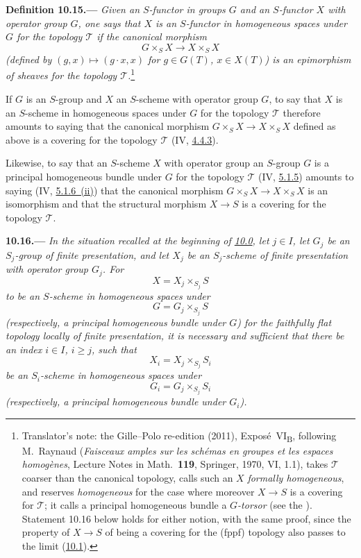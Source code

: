 \medskip
{}\label{def:sga3-VIB-10.15}%
\noindent\textbf{Definition 10.15.---}%
\emph{Given an \(S\)-functor in groups \(G\) and an \(S\)-functor \(X\)
with operator group \(G\), one says that \(X\) is an \(S\)-functor in
homogeneous spaces under \(G\) for the topology \(\mathcal T\) if the
canonical morphism}
\label{form:sga3-VIB-10.15-Phi}%
\[
  G\times_S X\longrightarrow X\times_S X
\]
\emph{\textup{(}defined by \((g,x)\mapsto(g\cdot x,x)\) for \(g\in G(T)\),
\(x\in X(T)\)\textup{)} is an epimorphism of sheaves for the topology
\(\mathcal T\).}\footnote{Translator's note: the Gille--Polo re-edition (2011),
Expos\'e~VI\textsubscript{B}, following M.~Raynaud (\emph{Faisceaux amples sur les sch\'emas en groupes et les
espaces homog\`enes}, Lecture Notes in Math.\ \textbf{119}, Springer, 1970, VI, 1.1), takes \(\mathcal T\)
coarser than the canonical topology, calls such an \(X\) \emph{formally homogeneous}, and reserves
\emph{homogeneous} for the case where moreover \(X\to S\) is a covering for \(\mathcal T\); it calls a principal
homogeneous bundle a \emph{\(G\)-torsor} (see the ). Statement 10.16 below holds for either notion, with the same proof, since the property of
\(X\to S\) of being a covering for the \textup{(fppf)} topology also passes to the limit
(\hyperref[par:sga3-VIB-10.1]{10.1}).}

If \(G\) is an \(S\)-group and \(X\) an \(S\)-scheme with operator group
\(G\), to say that \(X\) is an \(S\)-scheme in homogeneous spaces under
\(G\) for the topology \(\mathcal T\) therefore amounts to saying that the
canonical morphism \(G\times_SX\to X\times_SX\) defined as above is a
covering for the topology \(\mathcal T\)
\textup{(IV, \hyperref[sga3:iv:proposition:4:4:3]{4.4.3})}.

Likewise, to say that an \(S\)-scheme \(X\) with operator group an
\(S\)-group \(G\) is a principal homogeneous bundle under \(G\) for the
topology \(\mathcal T\) \textup{(IV, \hyperref[sga3:iv:definition:5:1:5]{5.1.5})}
amounts to saying
\textup{(IV, \hyperref[sga3:iv:proposition:5:1:6:item:ii:01]{5.1.6~(ii)})} that
the canonical morphism \(G\times_SX\to X\times_SX\) is an isomorphism and
that the structural morphism \(X\to S\) is a covering for the topology
\(\mathcal T\).

\medskip
{}\label{prop:sga3-VIB-10.16}%
\noindent\textbf{10.16.---}
\emph{In the situation recalled at the beginning of
\hyperref[par:sga3-VIB-10.0]{10.0}, let \(j\in I\), let \(G_j\) be an
\(S_j\)-group of finite presentation, and let \(X_j\) be an
\(S_j\)-scheme of finite presentation with operator group \(G_j\). For}
\[
  X=X_j\times_{S_j}S
\]
\emph{to be an \(S\)-scheme in homogeneous spaces under}
\[
  G=G_j\times_{S_j}S
\]
\emph{\textup{(respectively, a principal homogeneous bundle under \(G\))}
for the faithfully flat topology locally of finite presentation, it is
necessary and sufficient that there be an index \(i\in I\), \(i\geq j\),
such that}
\[
  X_i=X_j\times_{S_j}S_i
\]
\emph{be an \(S_i\)-scheme in homogeneous spaces under}
\[
  G_i=G_j\times_{S_j}S_i
\]
\emph{\textup{(respectively, a principal homogeneous bundle under
\(G_i\))}.}

